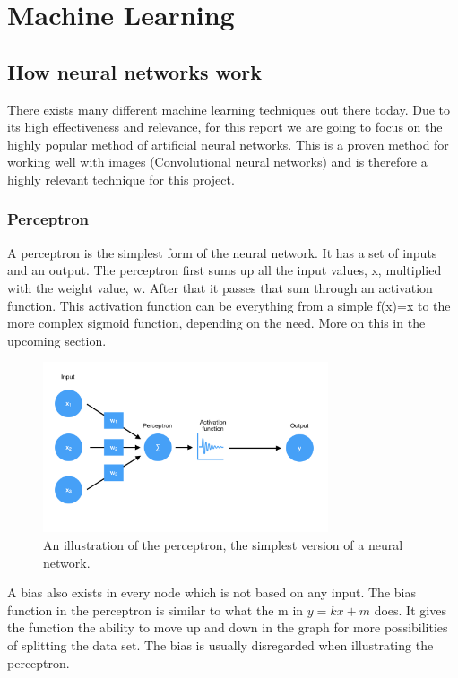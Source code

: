 \section{Machine Learning}

\subsection{How neural networks work}
There exists many different machine learning techniques out there today. Due to its high effectiveness and relevance, for this report we are going to focus on the highly popular method of artificial neural networks.
This is a proven method for working well with images (Convolutional neural networks) and is therefore a highly 
relevant technique for this project.

\subsubsection{Perceptron}
A perceptron is the simplest form of the neural network. It has a set of inputs and an output.
The perceptron first sums up all the input values, x, multiplied with the weight value, w.
After that it passes that sum through an activation function. This activation function can be everything from a simple f(x)=x to the more complex sigmoid function, depending on the need. More on this in the upcoming section.

\begin{figure}[hbtp]
\begin{center}
\includegraphics[width = 0.75\textwidth]{./Images/perceptron.jpg} 
\caption{An illustration of the perceptron, the simplest version of a neural network.}
\end{center}
\end{figure}

A bias also exists in every node which is not based on any input. The bias function in the perceptron is similar to what the m in $y = kx + m$ does. It gives the function the ability to move up and down in the graph for more possibilities of splitting the data set. The bias is usually disregarded when illustrating the perceptron.

